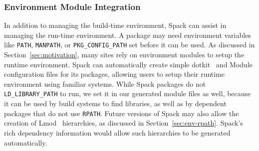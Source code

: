\subsubsection{Environment Module Integration}
\label{sec:envmodule}
In addition to managing the build-time environment, Spack can assist in managing
the run-time environment.  A package may need environment variables like {\tt PATH},
{\tt MANPATH}, or {\tt PKG\_CONFIG\_PATH} set before it can be used.
As discussed in Section~\ref{sec:motivation}, many sites rely on environment
modules to setup the runtime environment.  Spack can automatically create simple
dotkit~\cite{dotkit} and Module configuration files for its packages, allowing
users to setup their runtime environment using familiar systems.  While Spack
packages do not {\tt LD\_LIBRARY\_PATH} to run, we set it in our generated module
files as well, because it can be used by build systems to find libraries, as well
as by dependent packages that do not use {\tt RPATH}.
%
Future versions of Spack may also allow the creation of Lmod~\cite{mclay:lmod}
hierarchies, as discussed in Section~\ref{sec:env-rpath}. Spack's rich
dependency information would allow such hierarchies to be generated automatically.












